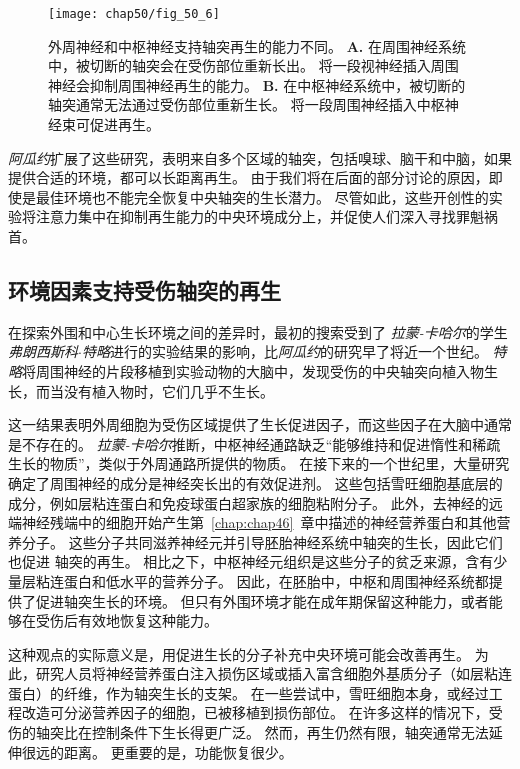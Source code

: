 \begin{figure}[htbp]
	\centering
	\texttt{[image: chap50/fig\_50\_6]}
	\caption{外周神经和中枢神经支持轴突再生的能力不同。
		\textbf{A.} 在周围神经系统中，被切断的轴突会在受伤部位重新长出。
		将一段视神经插入周围神经会抑制周围神经再生的能力。
		\textbf{B.} 在中枢神经系统中，被切断的轴突通常无法通过受伤部位重新生长。
		将一段周围神经插入中枢神经束可促进再生。}
	\label{fig:50_6}
\end{figure}


\textit{阿瓜约}扩展了这些研究，表明来自多个区域的轴突，包括嗅球、脑干和中脑，如果提供合适的环境，都可以长距离再生。
由于我们将在后面的部分讨论的原因，即使是最佳环境也不能完全恢复中央轴突的生长潜力。
尽管如此，这些开创性的实验将注意力集中在抑制再生能力的中央环境成分上，并促使人们深入寻找罪魁祸首。



\subsection{环境因素支持受伤轴突的再生}

在探索外围和中心生长环境之间的差异时，最初的搜索受到了 \textit{拉蒙-卡哈尔}的学生\textit{弗朗西斯科$\cdot$特略}进行的实验结果的影响，比\textit{阿瓜约}的研究早了将近一个世纪。
\textit{特略}将周围神经的片段移植到实验动物的大脑中，发现受伤的中央轴突向植入物生长，而当没有植入物时，它们几乎不生长。


这一结果表明外周细胞为受伤区域提供了生长促进因子，而这些因子在大脑中通常是不存在的。
\textit{拉蒙-卡哈尔}推断，中枢神经通路缺乏“能够维持和促进惰性和稀疏生长的物质”，类似于外周通路所提供的物质。
在接下来的一个世纪里，大量研究确定了周围神经的成分是神经突长出的有效促进剂。
这些包括雪旺细胞基底层的成分，例如层粘连蛋白和免疫球蛋白超家族的细胞粘附分子。
此外，去神经的远端神经残端中的细胞开始产生第~\ref{chap:chap46}~章中描述的神经营养蛋白和其他营养分子。
这些分子共同滋养神经元并引导胚胎神经系统中轴突的生长，因此它们也促进 轴突的再生。
相比之下，中枢神经元组织是这些分子的贫乏来源，含有少量层粘连蛋白和低水平的营养分子。
因此，在胚胎中，中枢和周围神经系统都提供了促进轴突生长的环境。
但只有外围环境才能在成年期保留这种能力，或者能够在受伤后有效地恢复这种能力。


这种观点的实际意义是，用促进生长的分子补充中央环境可能会改善再生。
为此，研究人员将神经营养蛋白注入损伤区域或插入富含细胞外基质分子（如层粘连蛋白）的纤维，作为轴突生长的支架。
在一些尝试中，雪旺细胞本身，或经过工程改造可分泌营养因子的细胞，已被移植到损伤部位。
在许多这样的情况下，受伤的轴突比在控制条件下生长得更广泛。
然而，再生仍然有限，轴突通常无法延伸很远的距离。
更重要的是，功能恢复很少。



